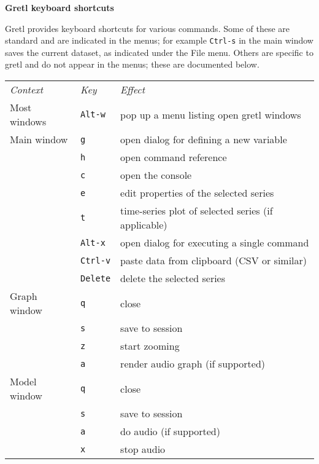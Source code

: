 \documentclass{article}
\begin{document}
\setlength{\parindent}{0pt}
\setlength{\parskip}{1ex}
\thispagestyle{empty}

\begin{center}
{\large \textbf{Gretl keyboard shortcuts}}
\end{center}

\textsf{Gretl} provides keyboard shortcuts for various commands. Some of
these are standard and are indicated in the menus; for example
\texttt{Ctrl-s} in the main window saves the current dataset, as
indicated under the \textsf{File} menu. Others are specific to
\textsf{gretl} and do not appear in the menus; these are documented
below.

\begin{center}
\begin{tabular}{p{}lp{}}
\textit{Context} & \textit{Key} & \textit{Effect} \\[6pt]

Most windows & \texttt{Alt-w} & 
  pop up a menu listing open \textsf{gretl} windows \\[6pt]

Main window & \texttt{g} & 
  open dialog for defining a new variable \\
 & \texttt{h} & open command reference \\
 & \texttt{c} & open the console \\
 & \texttt{e} & edit properties of the selected series \\
 & \texttt{t} & time-series plot of selected series (if applicable) \\
 & \texttt{Alt-x} & open dialog for executing a single command \\
 & \texttt{Ctrl-v} & paste data from clipboard (CSV or similar) \\
 & \texttt{Delete} & delete the selected series \\[6pt]

Graph window & \texttt{q} & close \\
 & \texttt{s} & save to session \\
 & \texttt{z} & start zooming \\
 & \texttt{a} & render audio graph (if supported) \\[6pt]

Model window & \texttt{q} & close \\
 & \texttt{s} & save to session \\
 & \texttt{a} & do audio (if supported) \\
 & \texttt{x} & stop audio \\[6pt]


\end{tabular}
\end{center}
\end{document}
